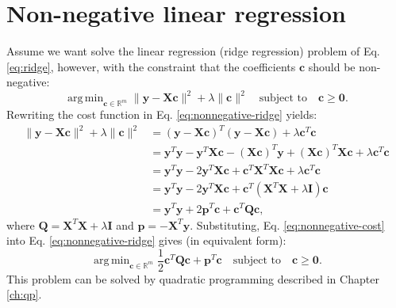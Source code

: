 \documentclass[11pt, a4paper, parskip=half*, bibliography=totoc, cleardoublepage=empty, final,
numbers=noenddot]{scrbook}
\DeclareMathOperator*{\argmin}{arg\,min}
\begin{document}
\section{Non-negative linear regression}
Assume we want solve the linear regression (ridge regression) problem of Eq. \ref{eq:ridge}, however, with the constraint that the coefficients $\bm{c}$ should be non-negative:
\begin{equation}
\argmin_{\bm{c} \in \mathbb{R}^m} \| \bm{y} - \bm{X} \bm{c} \|^2+ \lambda \| \bm{c} \|^2
\quad \text{subject to} \quad   \bm{c} \geq \bm{0}.
\label{eq:nonnegative-ridge}
\end{equation}
Rewriting the cost function in Eq. \ref{eq:nonnegative-ridge} yields:
\begin{align}
\| \bm{y} - \bm{X} \bm{c} \|^2+ \lambda \| \bm{c} \|^2 
&= (\bm{y} - \bm{X} \bm{c})^T (\bm{y} - \bm{X} \bm{c}) + \lambda \bm{c}^T \bm{c}\\
&= \bm{y}^T \bm{y} - \bm{y}^T \bm{X} \bm{c} - (\bm{X} \bm{c})^T \bm{y}  + (\bm{X} \bm{c})^T  \bm{X} \bm{c} + \lambda \bm{c}^T \bm{c} \\
&= \bm{y}^T \bm{y} -2 \bm{y}^T \bm{X} \bm{c}  + \bm{c}^T \bm{X}^T  \bm{X} \bm{c} + \lambda \bm{c}^T \bm{c}\\
&= \bm{y}^T \bm{y} -2 \bm{y}^T \bm{X} \bm{c}  + \bm{c}^T (\bm{X}^T  \bm{X} + \lambda \bm{I}) \bm{c} \\
&= \bm{y}^T \bm{y} +2 \bm{p}^T \bm{c}  + \bm{c}^T \bm{Q} \bm{c},
\label{eq:nonnegative-cost}
\end{align}
where $\bm{Q} = \bm{X}^T  \bm{X} + \lambda \bm{I} $ and $\bm{p} =- \bm{X}^T \bm{y}$. Substituting, Eq. \ref{eq:nonnegative-cost} into Eq. \ref{eq:nonnegative-ridge} gives (in equivalent form):
\begin{equation}
\argmin_{\bm{c} \in \mathbb{R}^m} \frac{1}{2} \bm{c}^T \bm{Q} \bm{c} +\bm{p}^T \bm{c} \quad \text{subject to} \quad   \bm{c} \geq \bm{0}.
\label{eq:nonnegative-ridge}
\end{equation}
This problem can be solved by quadratic programming described in Chapter \ref{ch:qp}.
\end{document}
